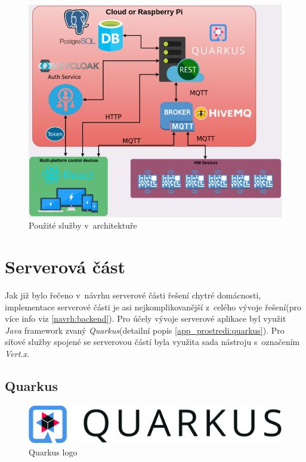 \begin{figure}[hbt]
  \centering
  \includegraphics[width=0.9 \linewidth]{obrazky-figures/technologie.png}
  \caption{Použité služby v~architektuře}
  \label{figure:technologie_architektura}
\end{figure}

\newpage
\section{Serverová část}
\label{pouzite:backend}
Jak již bylo řečeno v~návrhu serverové části řešení chytré domácnosti, implementace serverové části je asi nejkomplikovanější z~celého vývoje řešení(pro více info viz \ref{navrh:backend}).
Pro účely vývoje serverové aplikace byl využit \emph{Java} framework zvaný \emph{Quarkus}(detailní popis \ref{app_prostredi:quarkus}).
Pro síťové služby spojené se serverovou částí byla využita sada nástroju s~označením \emph{Vert.x}.

\subsection*{Quarkus}
\label{pouzite:quarkus}

\begin{figure}[!ht]
  \centering
  \includegraphics[width=.45 \linewidth]{obrazky-figures/quarkus_logo.png}
  \caption{Quarkus logo}
  \label{figure:quarkus_logo}
\end{figure}

